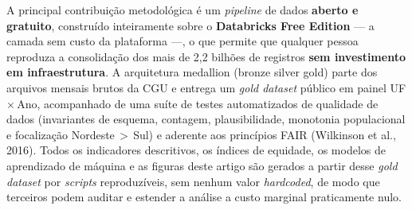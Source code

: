 \documentclass[12pt,a4paper,oneside]{article}
\begin{document}
A principal contribuição metodológica é um \textit{pipeline} de dados
\textbf{aberto e gratuito}, construído inteiramente sobre o
\textbf{Databricks Free Edition} --- a camada sem custo da plataforma ---,
o que permite que qualquer pessoa reproduza a consolidação dos mais de
2,2 bilhões de registros \textbf{sem investimento em infraestrutura}.
A arquitetura medallion (bronze \textrightarrow{} silver
\textrightarrow{} gold) parte dos arquivos mensais brutos da CGU e
entrega um \textit{gold dataset} público em painel UF\,$\times$\,Ano,
acompanhado de uma suíte de testes automatizados de qualidade de dados
(invariantes de esquema, contagem, plausibilidade, monotonia
populacional e focalização Nordeste\,$>$\,Sul) e aderente aos
princípios FAIR (Wilkinson et al., 2016). Todos os indicadores
descritivos, os índices de equidade, os modelos de aprendizado de
máquina e as figuras deste artigo são gerados a partir desse
\textit{gold dataset} por \textit{scripts} reproduzíveis, sem nenhum
valor \textit{hardcoded}, de modo que terceiros podem auditar e
estender a análise a custo marginal praticamente nulo.
\end{document}

